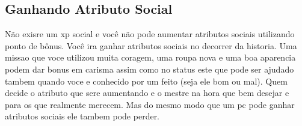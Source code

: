 \subsection{Ganhando Atributo Social}

Não exisre um xp social e você não pode aumentar atributos sociais utilizando ponto de bônus. Você ira ganhar atributos sociais no decorrer da historia. Uma missao que voce utilizou muita coragem, uma roupa nova e uma boa aparencia podem dar bonus em carisma assim como no status este que pode ser ajudado tambem quando voce e conhecido por um feito (seja ele bom ou mal). Quem decide o atributo que sere aumentando e o mestre na hora que bem desejar e para os que realmente merecem. Mas do mesmo modo que um pc pode ganhar atributos sociais ele tambem pode perder.	

   
